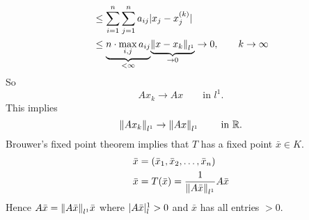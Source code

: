 \begin{beweis}
\begin{align*}
	&\leq  \sum^{n}_{i=1} \sum^{n}_{j=1} a_{ij} \abs{x_j-x_j^{(k)}} \\
	&\leq \underset{< \infty}{\underbrace{n \cdot \max\limits_{i,j} a_{ij}}} \underset{\to 0}{\underbrace{\norm{x-x_k}_{l^1}}} \to 0, \qquad k \to \infty
\end{align*}
So \[
	Ax_k \to Ax \qquad \text{in }l^1.
\]
This implies
\[
	\norm{Ax_k}_{l^1} \to \norm{Ax}_{l^1} \qquad \text{ in }\mathbb{R}.
\]
Brouwer's fixed point theorem implies that $T$ has a fixed point $\bar{x} \in K$.
\begin{align*}
	\bar{x} &= (\bar{x}_1,\bar{x}_2,\dots,\bar{x}_n) \\
	\bar{x} &= T(\bar{x}) = \frac{1}{\norm{A \bar{x}}_{l^1}} A \bar{x} 
\end{align*}
Hence
$A \bar{x} = \norm{ A \bar{x}}_{l^1} \bar{x}$ where $\lvert A \bar{x}\rvert_l^1 >0$ and $\bar{x}$ has all entries $>0$.
\end{beweis}

